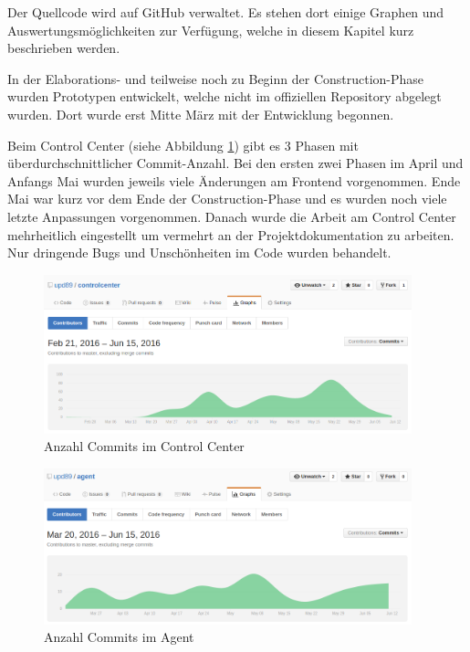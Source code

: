 Der Quellcode wird auf GitHub verwaltet. Es stehen dort einige Graphen und Auswertungsmöglichkeiten zur Verfügung, welche in diesem Kapitel kurz beschrieben werden.

In der Elaborations- und teilweise noch zu Beginn der Construction-Phase wurden Prototypen entwickelt, welche nicht im offiziellen Repository abgelegt wurden. Dort wurde erst Mitte März mit der Entwicklung begonnen. 

Beim Control Center (siehe Abbildung \ref{fig:commits-cc}) gibt es 3 Phasen mit überdurchschnittlicher Commit-Anzahl. Bei den ersten zwei Phasen im April und Anfangs Mai wurden jeweils viele Änderungen am Frontend vorgenommen. Ende Mai war kurz vor dem Ende der Construction-Phase und es wurden noch viele letzte Anpassungen vorgenommen. Danach wurde die Arbeit am Control Center mehrheitlich eingestellt um vermehrt an der Projektdokumentation zu arbeiten. Nur dringende Bugs und Unschönheiten im Code wurden behandelt.

\begin{figure}
  \centering
    \includegraphics[width=0.95\textwidth]{fig/controlcenter_commits}
  \caption{Anzahl Commits im Control Center}
  \label{fig:commits-cc}
\end{figure}


\begin{figure}
  \centering
    \includegraphics[width=0.95\textwidth]{fig/agent_commits}
  \caption{Anzahl Commits im Agent}
  \label{fig:commits-a}
\end{figure}

